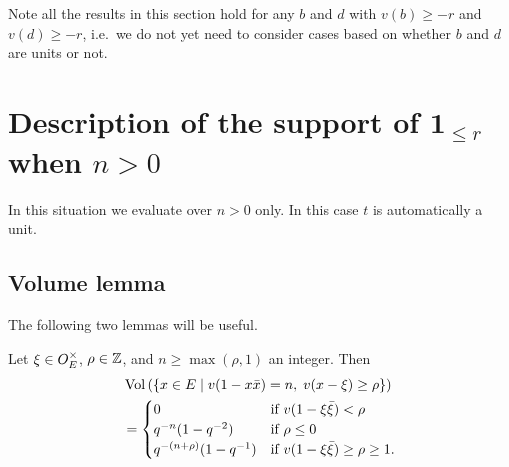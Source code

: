 Note all the results in this section hold for any $b$ and $d$
with $v(b) \ge -r$ and $v(d) \ge -r$, i.e.~we do not yet need to consider cases
based on whether $b$ and $d$ are units or not.

\section{Description of the support of $\mathbf{1}_{\le r}$ when $n > 0$}
In this situation we evaluate over $n > 0$ only.
In this case $t$ is automatically a unit.

\subsection{Volume lemma}
The following two lemmas will be useful.

\begin{lemma}
  \label{lem:volume}
  Let $\xi \in O_E^\times$, $\rho \in \mathbb Z$, and $n \ge \max(\rho, 1)$ an integer.
  Then
  \begin{align*}
    &\operatorname{Vol}\left( \left\{ x \in E \mid v(1-x \bar x) = n,
      \; v(x-\xi) \ge \rho \right\} \right) \\
    &=
    \begin{cases}
      0 & \text{if } v(1-\xi\bar\xi) < \rho \\
      q^{-n}(1-q^{-2}) & \text{if } \rho \le 0 \\
      q^{-(n+\rho)}(1-q^{-1}) & \text{if } v(1-\xi\bar\xi) \ge \rho \ge 1.
    \end{cases}
  \end{align*}
\end{lemma}
